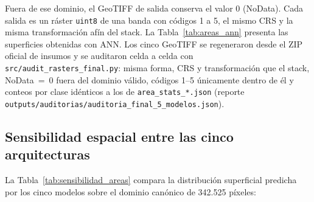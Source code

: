 \documentclass[11pt,a4paper]{article}
\newcommand{\estadoauditoria}{Los cinco GeoTIFF se regeneraron desde el ZIP oficial de insumos y se auditaron celda a celda con \texttt{src/audit\_rasters\_final.py}: misma forma, CRS y transformación que el stack, NoData~=~0 fuera del dominio válido, códigos 1--5 únicamente dentro de él y conteos por clase idénticos a los de \texttt{area\_stats\_*.json} (reporte \texttt{outputs/auditorias/auditoria\_final\_5\_modelos.json}).}
\begin{document}
Fuera de ese dominio, el GeoTIFF de salida conserva el valor 0 (NoData). Cada salida es un ráster \texttt{uint8} de una banda con códigos 1 a 5, el mismo CRS y la misma transformación afín del stack. La Tabla~\ref{tab:areas_ann} presenta las superficies obtenidas con ANN. \estadoauditoria

\begin{table}[H]
\centering
\small
{}
\caption{Superficie por cobertura obtenida con la Red Neuronal Artificial (ANN/MLP), según \texttt{outputs/metrics/inferencia\_10bandas/area\_stats\_ann.json}.}
\label{tab:areas_ann}
\end{table}

\subsection{Sensibilidad espacial entre las cinco arquitecturas}
La Tabla~\ref{tab:sensibilidad_areas} compara la distribución superficial predicha por los cinco modelos sobre el dominio canónico de 342.525 píxeles:
\end{document}
